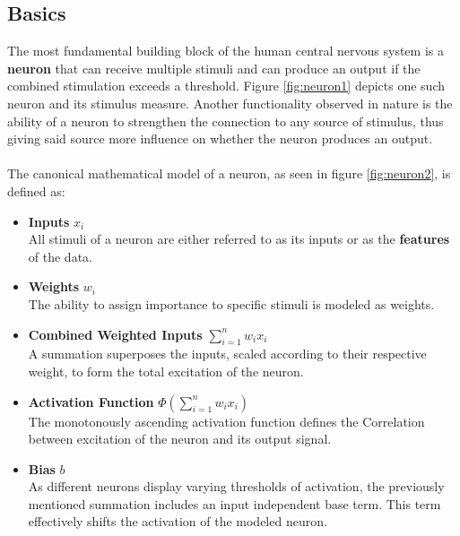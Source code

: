 \subsection{Basics}
The most fundamental building block of the human central nervous system is a \textbf{neuron} that can receive multiple stimuli and can produce an output if the combined stimulation exceeds a threshold. Figure \ref{fig:neuron1} depicts one such neuron and its stimulus measure. Another functionality observed in nature is the ability of a neuron to strengthen the connection to any source of stimulus, thus giving said source more influence on whether the neuron produces an output.\cite{Biology_Background}\\
\\
The canonical mathematical model of a neuron, as seen in figure \ref{fig:neuron2}, is defined as:
\begin{itemize}
	\item \textbf{Inputs} $x_i$\\
	All stimuli of a neuron are either referred to as its inputs or as the \textbf{features} of the data.\\
	\item \textbf{Weights} $w_i$\\
	The ability to assign importance to specific stimuli is modeled as weights.\\
	\item \textbf{Combined Weighted Inputs} $\sum_{i=1}^{n}w_i x_i$\\
	A summation superposes the inputs, scaled according to their respective weight, to form the total excitation of the neuron.\\
	\item \textbf{Activation Function} $\Phi(\sum_{i=1}^{n}w_i x_i)$\\
	The monotonously ascending activation function defines the Correlation between excitation of the neuron and its output signal.\\
	\item \textbf{Bias} $b$\\  
	As different neurons display varying thresholds of activation, the previously mentioned summation includes an input independent base term. This term effectively shifts the activation of the modeled neuron.\\
\end{itemize}


